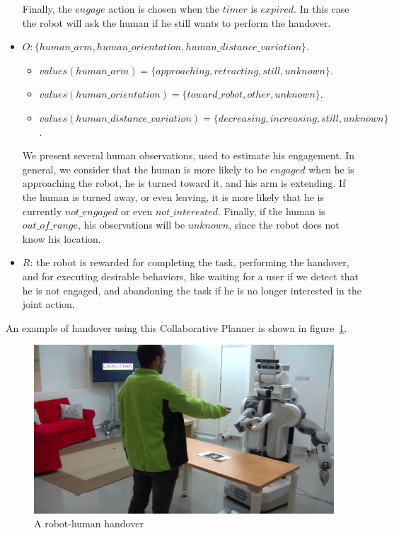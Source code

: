 \begin{itemize}
		Finally, the $engage$ action is chosen when the $timer$ is $expired$. In this case the robot will ask the human if he still wants to perform the handover.
	\item $O:\{human\_arm,human\_orientation,human\_distance\_variation\}$.
		\begin{itemize}
			\item $values(human\_arm)=\{approaching,retracting,still,unknown\}$.
			\item $values(human\_orientation)=\{toward\_robot,other,unknown\}$.
			\item $values(human\_distance\_variation)=\{decreasing,increasing,still,unknown\}$.
		\end{itemize}

		We present several human observations, used to estimate his engagement. In general, we consider that the human is more likely to be $engaged$ when he is approaching the robot, he is turned toward it, and his arm is extending. If the human is turned away, or even leaving, it is more likely that he is currently $not\_engaged$ or even $not\_interested$. Finally, if the human is $out\_of\_range$, his observations will be $unknown$, since the robot does not know his location.

	\item  $R$: the robot is rewarded for completing the task, performing the handover, and for executing desirable behaviors, like waiting for a user if we detect that he is not engaged, and abandoning the task if he is no longer interested in the joint action. 
\end{itemize}

An example of handover using this Collaborative Planner is shown in figure~\ref{fig:task_execution-handover}.

\begin{figure}[h!]
	\centering
	\includegraphics[scale=0.3]{img/coworker/task_execution/handover.pdf}
	\caption[Handover]{A robot-human handover}
	\label{fig:task_execution-handover}
\end{figure}
